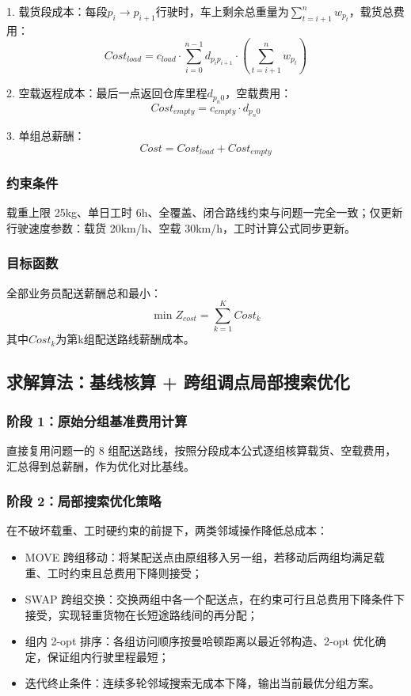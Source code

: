 \documentclass[withoutpreface,bwprint]{cumcmthesis} %
\begin{document}
\par1.	 载货段成本：每段\(p_i \to p_{i+1}\)行驶时，车上剩余总重量为\(\sum_{t=i+1}^n w_{p_t}\)，载货总费用：
\begin{equation}
Cost_{load}=c_{load} \cdot \sum_{i=0}^{n-1} d_{p_i p_{i+1}} \cdot (\sum_{t=i+1}^n w_{p_t})
\label{eq:energy}
\end{equation}

\par2.	 空载返程成本：最后一点返回仓库里程\(d_{p_n 0}\)，空载费用：
\begin{equation}
Cost_{empty}=c_{empty} \cdot d_{p_n 0}
\label{eq:energy}
\end{equation}

\par3.	 单组总薪酬：
\begin{equation}
Cost = Cost_{load} + Cost_{empty}
\label{eq:energy}
\end{equation}

\subsubsection{约束条件}
载重上限 25kg、单日工时 6h、全覆盖、闭合路线约束与问题一完全一致；仅更新行驶速度参数：载货 20km/h、空载 30km/h，工时计算公式同步更新。

\subsubsection{目标函数}
全部业务员配送薪酬总和最小：
\begin{equation}
\min Z_{cost} = \sum_{k=1}^K Cost_k
\label{eq:energy}
\end{equation}
其中\(Cost_k\)为第k组配送路线薪酬成本。


\subsection{求解算法：基线核算 + 跨组调点局部搜索优化}
\subsubsection{阶段 1：原始分组基准费用计算}
直接复用问题一的 8 组配送路线，按照分段成本公式逐组核算载货、空载费用，汇总得到总薪酬，作为优化对比基线。

\subsubsection{阶段 2：局部搜索优化策略}
在不破坏载重、工时硬约束的前提下，两类邻域操作降低总成本：
\begin{itemize}
    \item MOVE 跨组移动：将某配送点由原组移入另一组，若移动后两组均满足载重、工时约束且总费用下降则接受；
    \item SWAP 跨组交换：交换两组中各一个配送点，在约束可行且总费用下降条件下接受，实现轻重货物在长短途路线间的再分配；
    \item 组内 2-opt 排序：各组访问顺序按曼哈顿距离以最近邻构造、2-opt 优化确定，保证组内行驶里程最短；
    \item 迭代终止条件：连续多轮邻域搜索无成本下降，输出当前最优分组方案。
\end{itemize}
\end{document}
